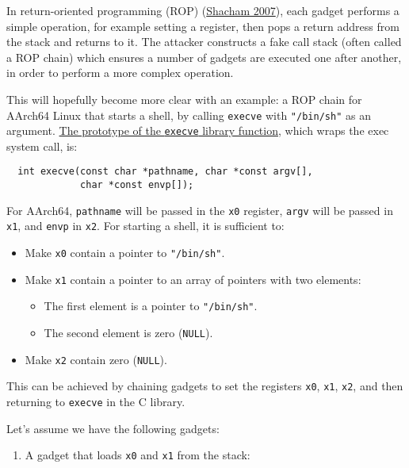 \documentclass[
  a4paper,
]{report}
\providecommand{\tightlist}{%
  \setlength{\itemsep}{0pt}\setlength{\parskip}{0pt}}
\begin{document}
In return-oriented programming
(ROP)
(\protect\hyperlink{ref-Shacham2007}{Shacham 2007}), each gadget
performs a simple operation, for example setting a register, then pops a
return address from the stack and returns to it. The attacker constructs
a fake call stack (often called a ROP chain) which ensures a number of gadgets are executed one after
another, in order to perform a more complex operation.

This will hopefully become more clear with an example: a ROP chain for
AArch64 Linux that starts a shell, by calling \texttt{execve} with
\texttt{"/bin/sh"} as an argument.
\href{https://man7.org/linux/man-pages/man2/execve.2.html}{The prototype
of the \texttt{execve} library function}, which wraps the exec system
call, is:

\begin{verbatim}
  int execve(const char *pathname, char *const argv[],
             char *const envp[]);
\end{verbatim}

For AArch64, \texttt{pathname} will be passed in the \texttt{x0}
register, \texttt{argv} will be passed in \texttt{x1}, and \texttt{envp}
in \texttt{x2}. For starting a shell, it is sufficient to:

\begin{itemize}
\tightlist
\item
  Make \texttt{x0} contain a pointer to \texttt{"/bin/sh"}.
\item
  Make \texttt{x1} contain a pointer to an array of pointers with two
  elements:

  \begin{itemize}
  \tightlist
  \item
    The first element is a pointer to \texttt{"/bin/sh"}.
  \item
    The second element is zero (\texttt{NULL}).
  \end{itemize}
\item
  Make \texttt{x2} contain zero (\texttt{NULL}).
\end{itemize}

This can be achieved by chaining gadgets to set the registers
\texttt{x0}, \texttt{x1}, \texttt{x2}, and then returning to
\texttt{execve} in the C library.

Let's assume we have the following gadgets:

\begin{enumerate}
\def\labelenumi{\arabic{enumi}.}
\tightlist
\item
  A gadget that loads \texttt{x0} and \texttt{x1} from the stack:
\end{enumerate}
\end{document}
